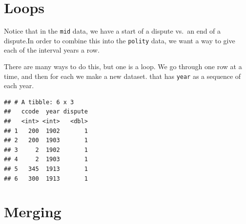 \documentclass[]{book}
\newenvironment{Shaded}{\begin{snugshade}}{\end{snugshade}}
\newcommand{\CommentTok}[1]{\textcolor[rgb]{0.56,0.35,0.01}{\textit{#1}}}
\newcommand{\ControlFlowTok}[1]{\textcolor[rgb]{0.13,0.29,0.53}{\textbf{#1}}}
\newcommand{\DataTypeTok}[1]{\textcolor[rgb]{0.13,0.29,0.53}{#1}}
\newcommand{\DecValTok}[1]{\textcolor[rgb]{0.00,0.00,0.81}{#1}}
\newcommand{\KeywordTok}[1]{\textcolor[rgb]{0.13,0.29,0.53}{\textbf{#1}}}
\newcommand{\NormalTok}[1]{#1}
\newcommand{\OperatorTok}[1]{\textcolor[rgb]{0.81,0.36,0.00}{\textbf{#1}}}
\newcommand{\StringTok}[1]{\textcolor[rgb]{0.31,0.60,0.02}{#1}}
\theoremstyle{definition}
\theoremstyle{definition}
\theoremstyle{definition}
\theoremstyle{remark}
\begin{document}
\hypertarget{loops}{%
\section{Loops}\label{loops}}

Notice that in the \texttt{mid} data, we have a start of a dispute vs.~an end of a dispute.In order to combine this into the \texttt{polity} data, we want a way to give each of the interval years a row.

There are many ways to do this, but one is a loop. We go through one row at a time, and then for each we make a new dataset. that has \texttt{year} as a sequence of each year.

\begin{Shaded}
\end{Shaded}

\begin{verbatim}
## # A tibble: 6 x 3
##   ccode  year dispute
##   <int> <int>   <dbl>
## 1   200  1902       1
## 2   200  1903       1
## 3     2  1902       1
## 4     2  1903       1
## 5   345  1913       1
## 6   300  1913       1
\end{verbatim}

\hypertarget{merging}{%
\section{Merging}\label{merging}}
\end{document}
